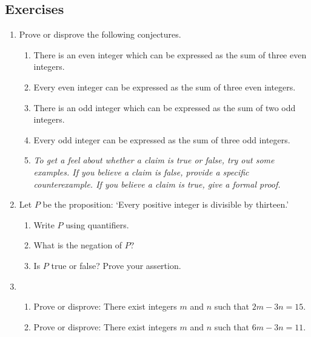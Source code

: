\subsection*{Exercises}

\begin{enumerate}\renewcommand{\labelenumi}{\thesubsection.\theenumi}


  \item Prove or disprove the following conjectures.\prelistskip
	\begin{enumerate}
	  \item There is an even integer which can be expressed as the sum of three even integers.
	  \item Every even integer can be expressed as the sum of three even integers. 
	  \item There is an odd integer which can be expressed as the sum of two odd integers.
	  \item Every odd integer can be expressed as the sum of three odd integers.
		\item[]\emph{To get a feel about whether a claim is true or false, try out some examples. If you believe a claim is false, provide a specific counterexample. If you believe a claim is true, give a formal proof.}
\end{enumerate}

	\item Let $P$ be the proposition: `Every positive integer is divisible by thirteen.'\prelistskip
    \begin{enumerate}
      \item Write $P$ using quantifiers.
      \item What is the negation of $P$?
      \item Is $P$ true or false? Prove your assertion.
    \end{enumerate}


	\item \begin{enumerate} \item Prove or disprove: There exist integers $m$ and $n$ such that $2m-3n=15$. 
	\item Prove or disprove: There exist integers $m$ and $n$ such that $6m-3n=11$. 
  \end{enumerate}


\end{enumerate}
